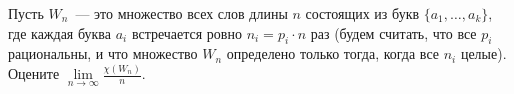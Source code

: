 Пусть $W_n$~--- это множество всех слов длины $n$ состоящих из букв $\{a_1, \dots, a_k\}$, где каждая
буква $a_i$ встречается ровно $n_i = p_i \cdot n$ раз (будем считать, что все $p_i$ рациональны, и что
множество $W_n$ определено только тогда, когда все $n_i$ целые). Оцените
$\lim\limits_{n \to \infty}\frac{\chi(W_n)}{n}$.
